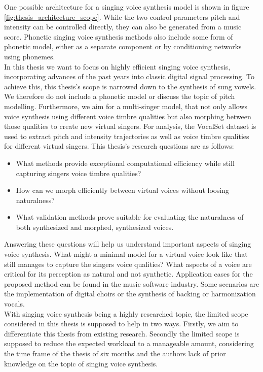 One possible architecture for a singing voice synthesis model is shown in figure \ref{fig:thesis_architecture_scope}. While the two control parameters pitch and intensity can be controlled directly, they can also be generated from a music score. Phonetic singing voice synthesis methods also include some form of phonetic model, either as a separate component or by conditioning networks using phonemes.\\
In this thesis we want to focus on highly efficient singing voice synthesis, incorporating advances of the past years into classic digital signal processing. To achieve this, this thesis's scope is narrowed down to the synthesis of sung vowels. We therefore do not include a phonetic model or discuss the topic of pitch modelling.
Furthermore, we aim for a multi-singer model, that not only allows voice synthesis using different voice timbre qualities but also morphing between those qualities to create new virtual singers. For analysis, the VocalSet dataset \cite{wilkins_vocalset:_2018} is used to extract pitch and intensity trajectories as well as voice timbre qualities for different virtual singers. This thesis's research questions are as follows:

\begin{itemize}
    \item What methods provide exceptional computational efficiency while still capturing singers voice timbre qualities?
    \item How can we morph efficiently between virtual voices without loosing naturalness?
    \item What validation methods prove suitable for evaluating the naturalness of both synthesized and morphed, synthesized voices.
\end{itemize}

Answering these questions will help us understand important aspects of singing voice synthesis. What might a minimal model for a virtual voice look like that still manages to capture the singers voice qualities? What aspects of a voice are critical for its perception as natural and not synthetic. Application cases for the proposed method can be found in the music software industry. Some scenarios are the implementation of digital choirs or the synthesis of backing or harmonization vocals.\\

With singing voice synthesis being a highly researched topic, the limited scope considered in  this thesis is supposed to help in two ways. Firstly, we aim to differentiate this thesis from existing research. Secondly the limited scope is supposed to reduce the expected workload to a manageable amount, considering the time frame of the thesis of six months and the authors lack of prior knowledge on the topic of singing voice synthesis. 
